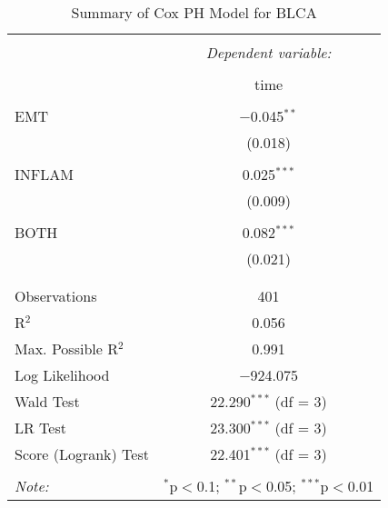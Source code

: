 
\begin{table}[!htbp] \centering 
  \caption{Summary of Cox PH Model for BLCA} 
  \label{table:BLCA_cph} 
\begin{tabular}{@{\extracolsep{5pt}}lc} 
\\[-1.8ex]\hline 
\hline \\[-1.8ex] 
 & \multicolumn{1}{c}{\textit{Dependent variable:}} \\ 
\cline{2-2} 
\\[-1.8ex] & time \\ 
\hline \\[-1.8ex] 
 EMT & $-$0.045$^{**}$ \\ 
  & (0.018) \\ 
  & \\ 
 INFLAM & 0.025$^{***}$ \\ 
  & (0.009) \\ 
  & \\ 
 BOTH & 0.082$^{***}$ \\ 
  & (0.021) \\ 
  & \\ 
\hline \\[-1.8ex] 
Observations & 401 \\ 
R$^{2}$ & 0.056 \\ 
Max. Possible R$^{2}$ & 0.991 \\ 
Log Likelihood & $-$924.075 \\ 
Wald Test & 22.290$^{***}$ (df = 3) \\ 
LR Test & 23.300$^{***}$ (df = 3) \\ 
Score (Logrank) Test & 22.401$^{***}$ (df = 3) \\ 
\hline 
\hline \\[-1.8ex] 
\textit{Note:}  & \multicolumn{1}{r}{$^{*}$p$<$0.1; $^{**}$p$<$0.05; $^{***}$p$<$0.01} \\ 
\end{tabular} 
\end{table} 
